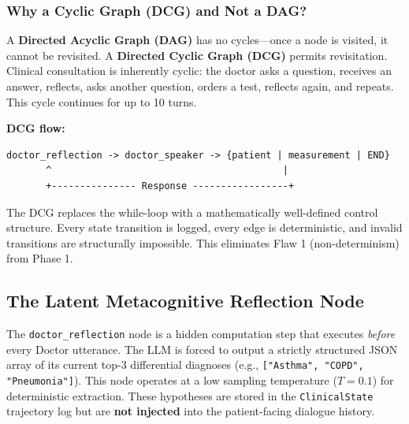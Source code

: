 \subsubsection{Why a Cyclic Graph (DCG) and Not a DAG?}

\begin{acadbox}[\textcolor{white}{Academic Definition}]
A \textbf{Directed Acyclic Graph (DAG)} has no cycles---once a node is visited, it cannot be revisited. A \textbf{Directed Cyclic Graph (DCG)} permits revisitation. Clinical consultation is inherently cyclic: the doctor asks a question, receives an answer, reflects, asks another question, orders a test, reflects again, and repeats. This cycle continues for up to 10 turns.
\end{acadbox}

\textbf{DCG flow:}
\begin{verbatim}
doctor_reflection -> doctor_speaker -> {patient | measurement | END}
       ^                                         |
       +--------------- Response -----------------+
\end{verbatim}

\begin{mattersbox}[\textcolor{white}{Why It Matters for This Thesis}]
The DCG replaces the while-loop with a mathematically well-defined control structure. Every state transition is logged, every edge is deterministic, and invalid transitions are structurally impossible. This eliminates Flaw 1 (non-determinism) from Phase 1.
\end{mattersbox}

\subsection{The Latent Metacognitive Reflection Node}

\begin{acadbox}[\textcolor{white}{Academic Definition}]
The \texttt{doctor\_reflection} node is a hidden computation step that executes \textit{before} every Doctor utterance. The LLM is forced to output a strictly structured JSON array of its current top-3 differential diagnoses (e.g., \texttt{["Asthma", "COPD", "Pneumonia"]}). This node operates at a low sampling temperature ($T = 0.1$) for deterministic extraction. These hypotheses are stored in the \texttt{ClinicalState} trajectory log but are \textbf{not injected} into the patient-facing dialogue history.
\end{acadbox}

